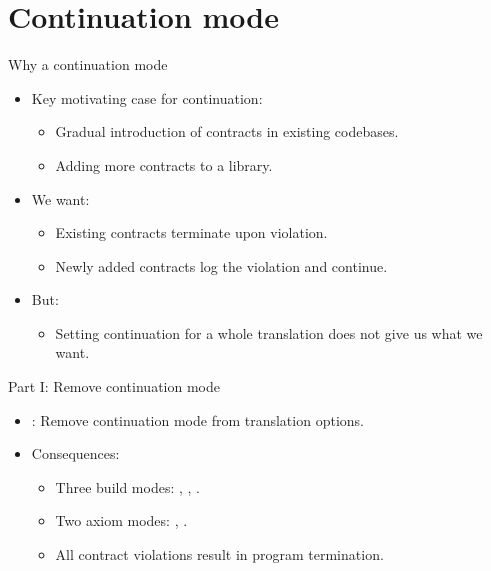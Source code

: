 \section{Continuation mode}

\begin{frame}[t]{Why a continuation mode}
\begin{itemize}
  \item Key motivating case for continuation:
    \begin{itemize}
      \item Gradual introduction of contracts in existing codebases.
      \item Adding more contracts to a library.
    \end{itemize}
  \item We want:
    \begin{itemize}
      \item Existing contracts terminate upon violation.
      \item Newly added contracts log the violation and continue.
    \end{itemize}
  \item But:
    \begin{itemize}
      \item Setting continuation for a whole translation does not give us what we want.
    \end{itemize}
\end{itemize}
\end{frame}

\begin{frame}[t]{Part I: Remove continuation mode}
\begin{itemize}
  \item {}: Remove continuation mode from translation options.

  \vfill
  \item Consequences:
    \begin{itemize}
      \item Three build modes: , , .
      \item Two axiom modes: , .
      \item All contract violations result in program termination.
    \end{itemize}
\end{itemize}
\end{frame}

